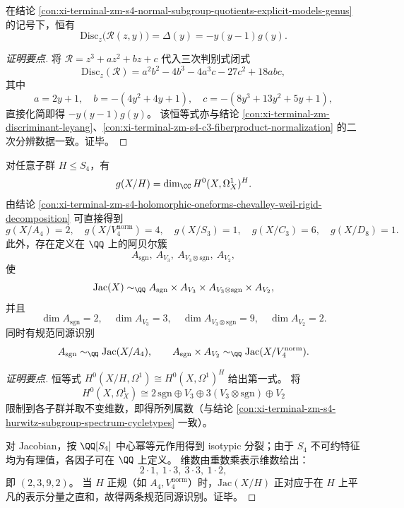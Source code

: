 \begin{conclusion}\label{con:xi-terminal-zm-s4-resolvent-cubic-discriminant-equals-delta}
在结论 \ref{con:xi-terminal-zm-s4-normal-subgroup-quotients-explicit-models-genus} 的记号下，恒有
\[
\mathrm{Disc}_z\!\bigl(\mathscr R(z,y)\bigr)=\Delta(y)=-y(y-1)g(y).
\]
\end{conclusion}
\begin{proof}[证明要点]
将 \(\mathscr R=z^3+az^2+bz+c\) 代入三次判别式闭式
\[
\mathrm{Disc}_z(\mathscr R)=a^2b^2-4b^3-4a^3c-27c^2+18abc,
\]
其中
\[
a=2y+1,\quad b=-(4y^2+4y+1),\quad c=-(8y^3+13y^2+5y+1),
\]
直接化简即得 \(-y(y-1)g(y)\)。
该恒等式亦与结论 \ref{con:xi-terminal-zm-discriminant-leyang}、\ref{con:xi-terminal-zm-s4-c3-fiberproduct-normalization} 的二次分辨数据一致。证毕。
\end{proof}

\begin{conclusion}\label{con:xi-terminal-zm-s4-quotient-genus-spectrum-and-jacobian-representation-splitting}
对任意子群 \(H\le S_4\)，有
\[
g(X/H)=\dim_{\CC}H^0(X,\Omega_X^1)^H.
\]
由结论 \ref{con:xi-terminal-zm-s4-holomorphic-oneforms-chevalley-weil-rigid-decomposition} 可直接得到
\[
g(X/A_4)=2,\quad
g(X/V_4^{\mathrm{norm}})=4,\quad
g(X/S_3)=1,\quad
g(X/C_3)=6,\quad
g(X/D_8)=1.
\]
此外，存在定义在 \(\QQ\) 上的阿贝尔簇
\[
A_{\mathrm{sgn}},\ A_{V_3},\ A_{V_3\otimes\mathrm{sgn}},\ A_{V_2},
\]
使
\[
\mathrm{Jac}(X)\sim_{\QQ}
A_{\mathrm{sgn}}\times A_{V_3}\times A_{V_3\otimes\mathrm{sgn}}\times A_{V_2},
\]
并且
\[
\dim A_{\mathrm{sgn}}=2,\quad
\dim A_{V_3}=3,\quad
\dim A_{V_3\otimes\mathrm{sgn}}=9,\quad
\dim A_{V_2}=2.
\]
同时有规范同源识别
\[
A_{\mathrm{sgn}}\sim_{\QQ}\mathrm{Jac}(X/A_4),\qquad
A_{\mathrm{sgn}}\times A_{V_2}\sim_{\QQ}\mathrm{Jac}(X/V_4^{\mathrm{norm}}).
\]
\end{conclusion}
\begin{proof}[证明要点]
恒等式 \(H^0(X/H,\Omega^1)\cong H^0(X,\Omega^1)^H\) 给出第一式。
将
\[
H^0(X,\Omega_X^1)\cong
2\,\mathrm{sgn}\oplus V_3\oplus 3(V_3\otimes\mathrm{sgn})\oplus V_2
\]
限制到各子群并取不变维数，即得所列属数（与结论
\ref{con:xi-terminal-zm-s4-hurwitz-subgroup-spectrum-cycletypes} 一致）。
\par
对 Jacobian，按 \(\QQ[S_4]\) 中心幂等元作用得到 isotypic 分裂；由于 \(S_4\) 不可约特征均为有理值，各因子可在 \(\QQ\) 上定义。
维数由重数乘表示维数给出：
\[
2\cdot 1,\ 1\cdot 3,\ 3\cdot 3,\ 1\cdot 2,
\]
即 \((2,3,9,2)\)。
当 \(H\) 正规（如 \(A_4,V_4^{\mathrm{norm}}\)）时，\(\mathrm{Jac}(X/H)\) 正对应于在 \(H\) 上平凡的表示分量之直和，故得两条规范同源识别。证毕。
\end{proof}



